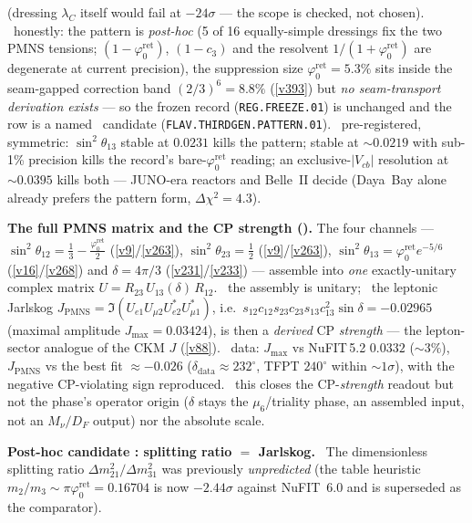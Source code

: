 \documentclass[11pt,a4paper]{article}
\newcommand{\cthree}{c_3}
\newcommand{\phiz}{\varphi_0^{\mathrm{ret}}}
\newcommand{\lamC}{\lambda_C}
\theoremstyle{definition}
\begin{document}
(dressing $\lamC$ itself would fail at $-24\sigma$ --- the scope is checked, not chosen). \mC\ honestly: the pattern
is \emph{post-hoc} (5 of 16 equally-simple dressings fix the two PMNS tensions; $(1-\phiz)$, $(1-\cthree)$ and the
resolvent $1/(1+\phiz)$ are degenerate at current precision), the suppression size $\phiz=5.3\%$ sits inside the
seam-gapped correction band $(2/3)^6=8.8\%$ (\vref{v393}) but \emph{no seam-transport derivation exists} --- so the
frozen record (\texttt{REG.FREEZE.01}) is unchanged and the row is a named \mO\ candidate
(\texttt{FLAV.THIRDGEN.PATTERN.01}). \mX\ pre-registered, symmetric: $\sin^2\theta_{13}$ stable at $0.0231$ kills the
pattern; stable at ${\sim}0.0219$ with sub-1\% precision kills the record's bare-$\phiz$ reading; an exclusive-$|V_{cb}|$
resolution at ${\sim}0.0395$ kills both --- JUNO-era reactors and Belle~II decide (Daya~Bay alone already prefers the
pattern form, $\Delta\chi^2=4.3$).
\par\smallskip\noindent\textbf{The full PMNS matrix and the CP strength ().}
The four channels --- $\sin^2\theta_{12}=\tfrac13-\tfrac{\phiz}2$ (\vref{v9}/\vref{v263}),
$\sin^2\theta_{23}=\tfrac12$ (\vref{v9}/\vref{v263}), $\sin^2\theta_{13}=\phiz e^{-5/6}$ (\vref{v16}/\vref{v268})
and $\delta=4\pi/3$ (\vref{v231}/\vref{v233}) --- assemble into \emph{one} exactly-unitary complex matrix
$U=R_{23}\,U_{13}(\delta)\,R_{12}$. \mE\ the assembly is unitary; \mC\ the leptonic Jarlskog
$J_{\mathrm{PMNS}}=\Im(U_{e1}U_{\mu2}U_{e2}^{*}U_{\mu1}^{*})$, i.e.\
$s_{12}c_{12}s_{23}c_{23}s_{13}c_{13}^2\sin\delta=-0.02965$ (maximal amplitude $J_{\max}=0.03424$), is then a
\emph{derived} CP \emph{strength} --- the lepton-sector analogue of the CKM $J$ (\vref{v88}). \mC\ data: $J_{\max}$ vs NuFIT\,5.2 $0.0332$ ($\sim3\%$),
$J_{\mathrm{PMNS}}$ vs the best fit $\approx-0.026$ ($\delta_{\mathrm{data}}\approx232^\circ$, TFPT $240^\circ$
within $\sim1\sigma$), with the negative CP-violating sign reproduced. \mO\ this closes the CP-\emph{strength}
readout but not the phase's operator origin ($\delta$ stays the $\mu_6$/triality phase, an assembled input,
not an $M_\nu/D_F$ output) nor the absolute scale.
\par\smallskip\noindent\textbf{Post-hoc candidate \mO: splitting ratio $=$ Jarlskog.}
\veri{v468\_dm2\_ratio\_jarlskog.py}\
The dimensionless splitting ratio $\Delta m^2_{21}/\Delta m^2_{31}$ was previously \emph{unpredicted} (the table
heuristic $m_2/m_3\sim\pi\phiz=0.16704$ is now $-2.44\sigma$ against NuFIT~6.0 and is superseded as the comparator).
\end{document}
